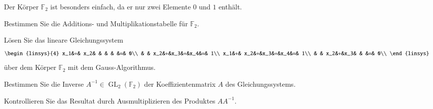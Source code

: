 Der Körper $\mathbb{F}_2$ ist besonders einfach, da er nur zwei Elemente
$0$ und $1$ enthält.
\begin{teilaufgaben}
\item
Bestimmen Sie die Additions- und Multiplikationstabelle für $\mathbb{F}_2$.
\item
Lösen Sie das lineare Gleichungssystem
\[
\begin{linsys}{4}
x_1&+& x_2& &   & &   &=& 0\\
   & & x_2&+&x_3&+&x_4&=& 1\\
x_1&+& x_2&+&x_3&+&x_4&=& 1\\
   & & x_2&+&x_3& &   &=& 0\\
\end{linsys}
\]
über dem Körper $\mathbb{F}_2$ mit dem Gauss-Algorithmus.
\item Bestimmen Sie die Inverse $A^{-1}\in \operatorname{GL}_2(\mathbb{F}_2)$
der Koeffizientenmatrix $A$ des Gleichungssystems.
\item Kontrollieren Sie das Resultat durch Ausmultiplizieren des Produktes
$AA^{-1}$.
\end{teilaufgaben}

